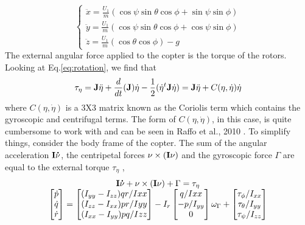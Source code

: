 \documentclass[11pt]{ucthesis}
\begin{document}
\vspace{-1cm}
\begin{equation}
\left\lbrace\begin{matrix}
\ddot{x} = \frac{U_1}{m} (\cos\psi\sin\theta\cos\phi + \sin\psi\sin\phi)\\
\ddot{y} = \frac{U_1}{m}(\cos\psi\sin\theta\cos\phi + \cos\psi\sin\phi) \\
\ddot{z} = \frac{U_1}{m}(\cos\theta\cos\phi) - g
\end{matrix}\right.
\end{equation}
The external angular force applied to the copter is the torque of the rotors. Looking at Eq.\ref{eq:rotation}, we find that
\vspace{-0.25cm}
\begin{equation}
\tau_{\eta} = \bold{J}\ddot{\eta} + \frac{d}{dt}({\bold{J})}\dot{\eta} -\frac{1}{2}(\dot{\eta}^t \bold{J} \dot{\eta}) = \bold{J}\ddot{\eta} + C(\eta, \dot{\eta})\dot{\eta}
\end{equation}
where $C(\eta, \dot{\eta})$ is a 3X3 matrix known as the Coriolis term which contains the gyroscopic and centrifugal terms. The form of $C(\eta, \dot{\eta})$, in this case, is quite cumbersome to work with and can be seen in Raffo et al., 2010 \cite{raffo2010integral}. To simplify things, consider the body frame of the copter. The sum of the angular acceleration $\bold{I}\bold{\dot{\nu}}$, the centripetal forces $\bold{\nu} \times (\bold{I\nu})$ and the gyroscopic force $\Gamma$ are  equal to the external torque $\tau_{\eta}$ \cite{bhosalemathematical},
\begin{equation}\label{eq:dynamicsEquations}
\begin{matrix}
\bold{I}\bold{\dot{\nu}} + \bold{\nu} \times (\bold{I\nu}) + \Gamma = \tau_{\eta}\\

\begin{bmatrix}
\dot{p}\\
\dot{q}\\
\dot{r}
\end{bmatrix} = 
\begin{bmatrix}
(I_{yy} - I_{zz})qr/I{xx}\\
(I_{zz} - I_{xx})pr/I{yy}\\
(I_{xx} - I_{yy})pq/I{zz}
\end{bmatrix}

-I_r

\begin{bmatrix}
q/I{xx}\\
-p/I_{yy}\\
0
\end{bmatrix} \omega_{\Gamma}

+ 	\begin{bmatrix}
\tau_{\phi} / I_{xx}\\
\tau_{\theta} / I_{yy}\\
\tau_{\psi} / I_{zz}
\end{bmatrix}
\end{matrix}
\end{equation}
\end{document}
